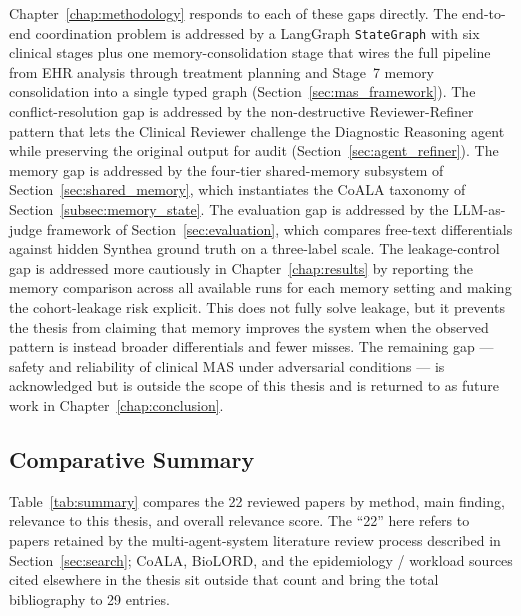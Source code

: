 Chapter~\ref{chap:methodology} responds to each of these gaps directly. The
end-to-end coordination problem is addressed by a LangGraph
\texttt{StateGraph} with six clinical stages plus one memory-consolidation
stage that wires the full pipeline from EHR analysis through treatment
planning and Stage~7 memory consolidation into a single typed graph
(Section~\ref{sec:mas_framework}). The conflict-resolution gap is addressed
by the non-destructive Reviewer-Refiner pattern that lets the Clinical
Reviewer challenge the Diagnostic Reasoning agent while preserving the
original output for audit (Section~\ref{sec:agent_refiner}). The memory gap
is addressed by the four-tier shared-memory subsystem of
Section~\ref{sec:shared_memory}, which instantiates the CoALA taxonomy of
Section~\ref{subsec:memory_state}. The evaluation gap is addressed by the
LLM-as-judge framework of Section~\ref{sec:evaluation}, which compares
free-text differentials against hidden Synthea ground truth on a three-label
scale. The leakage-control gap is addressed more cautiously in
Chapter~\ref{chap:results} by reporting the memory comparison across all
available runs for each memory setting and making the cohort-leakage risk
explicit. This does not fully solve leakage, but it prevents the thesis from
claiming that memory improves the system when the observed pattern is instead
broader differentials and fewer misses. The remaining gap ---
safety and reliability of clinical MAS under adversarial conditions --- is
acknowledged but is outside the scope of this thesis and is returned to as
future work in Chapter~\ref{chap:conclusion}.

\FloatBarrier
\subsection{Comparative Summary}
\label{subsec:summary_table}

Table~\ref{tab:summary} compares the 22 reviewed papers by method, main finding,
relevance to this thesis, and overall relevance score. The ``22'' here refers
to papers retained by the multi-agent-system literature review process
described in Section~\ref{sec:search}; CoALA, BioLORD, and the
epidemiology / workload sources cited elsewhere in the thesis sit outside
that count and bring the total bibliography to 29 entries.

